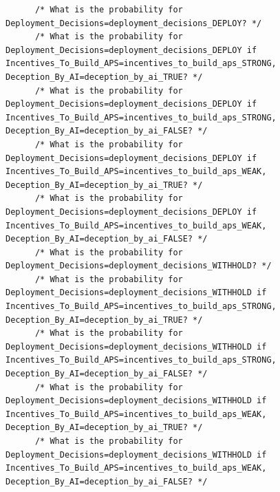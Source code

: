 \documentclass[
  11pt,
  letterpaper,
]{book}
\begin{document}
\begin{verbatim}
      /* What is the probability for Deployment_Decisions=deployment_decisions_DEPLOY? */
      /* What is the probability for Deployment_Decisions=deployment_decisions_DEPLOY if Incentives_To_Build_APS=incentives_to_build_aps_STRONG, Deception_By_AI=deception_by_ai_TRUE? */
      /* What is the probability for Deployment_Decisions=deployment_decisions_DEPLOY if Incentives_To_Build_APS=incentives_to_build_aps_STRONG, Deception_By_AI=deception_by_ai_FALSE? */
      /* What is the probability for Deployment_Decisions=deployment_decisions_DEPLOY if Incentives_To_Build_APS=incentives_to_build_aps_WEAK, Deception_By_AI=deception_by_ai_TRUE? */
      /* What is the probability for Deployment_Decisions=deployment_decisions_DEPLOY if Incentives_To_Build_APS=incentives_to_build_aps_WEAK, Deception_By_AI=deception_by_ai_FALSE? */
      /* What is the probability for Deployment_Decisions=deployment_decisions_WITHHOLD? */
      /* What is the probability for Deployment_Decisions=deployment_decisions_WITHHOLD if Incentives_To_Build_APS=incentives_to_build_aps_STRONG, Deception_By_AI=deception_by_ai_TRUE? */
      /* What is the probability for Deployment_Decisions=deployment_decisions_WITHHOLD if Incentives_To_Build_APS=incentives_to_build_aps_STRONG, Deception_By_AI=deception_by_ai_FALSE? */
      /* What is the probability for Deployment_Decisions=deployment_decisions_WITHHOLD if Incentives_To_Build_APS=incentives_to_build_aps_WEAK, Deception_By_AI=deception_by_ai_TRUE? */
      /* What is the probability for Deployment_Decisions=deployment_decisions_WITHHOLD if Incentives_To_Build_APS=incentives_to_build_aps_WEAK, Deception_By_AI=deception_by_ai_FALSE? */

\end{verbatim}
\end{document}
